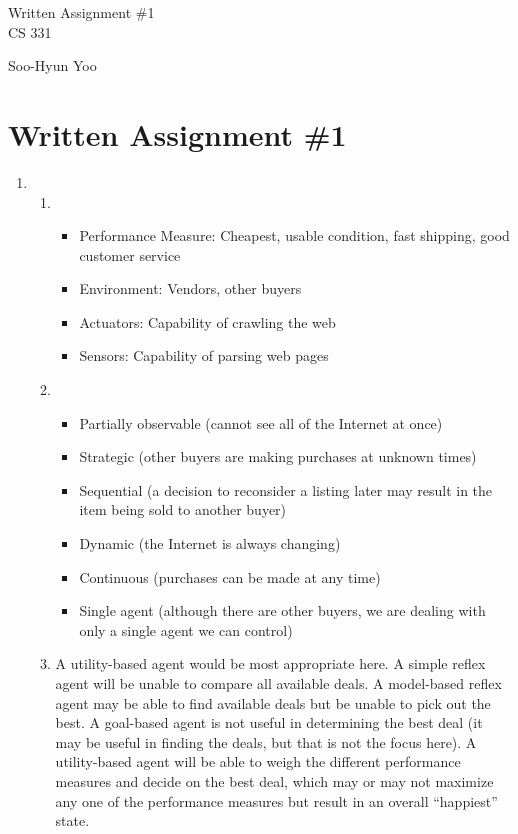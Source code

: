 \documentclass[10pt,letterpaper]{article}
\begin{document}
\begin{titlepage}
	\vspace*{4cm}
	\begin{flushright}
	{\huge
		Written Assignment \#1 \\ [3cm]
	}
	{\large
		CS 331
	}
	\end{flushright}

	\begin{flushright}
	Soo-Hyun Yoo
	\end{flushright}
\end{titlepage}

\section*{Written Assignment \#1}

\begin{enumerate}
	\item
		\begin{enumerate}
			\item
				\begin{itemize}
					\item Performance Measure: Cheapest, usable condition, fast
						shipping, good customer service
					\item Environment: Vendors, other buyers
					\item Actuators: Capability of crawling the web
					\item Sensors: Capability of parsing web pages
				\end{itemize}
			\item
				\begin{itemize}
					\item Partially observable (cannot see all of the Internet
						at once)
					\item Strategic (other buyers are making purchases at
						unknown times)
					\item Sequential (a decision to reconsider a listing later
						may result in the item being sold to another buyer)
					\item Dynamic (the Internet is always changing)
					\item Continuous (purchases can be made at any time)
					\item Single agent (although there are other buyers, we are
						dealing with only a single agent we can control)
				\end{itemize}
			\item A utility-based agent would be most appropriate here.
				A simple reflex agent will be unable to compare all available
				deals. A model-based reflex agent may be able to find available
				deals but be unable to pick out the best. A goal-based agent is
				not useful in determining the best deal (it may be useful in
				finding the deals, but that is not the focus here).
				A utility-based agent will be able to weigh the different
				performance measures and decide on the best deal, which may or
				may not maximize any one of the performance measures but result
				in an overall ``happiest'' state.
		\end{enumerate}


\end{enumerate}
\end{document}
